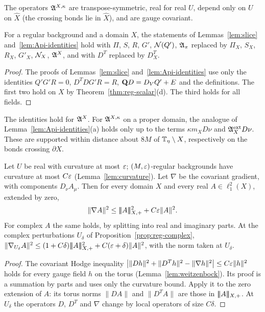 The operators $\mathfrak A^{X,\kappa}$ are transpose-symmetric, real for real $U$, depend only on $U$ on $\hat X$ (the crossing bonds lie in $\hat X$), and are gauge covariant.

\begin{lemma}\label{lem:domain-identities}
For a regular background and a domain $X$, the statements of Lemmas~\ref{lem:slice} and~\ref{lem:Api-identities} hold with $\Pi$, $S$, $R$, $G'$, $\mathcal N(Q')$, $\mathfrak A_\pi$ replaced by $\Pi_X$, $S_X$, $R_X$, $G'_X$, $\mathcal N_X$, $\mathfrak A^X$, and with $D^T$ replaced by $D^T_X$.
\end{lemma}

\begin{proof}
The proofs of Lemmas~\ref{lem:slice} and~\ref{lem:Api-identities} use only the identities $Q'G'R=0$, $D^TDG'R=R$, $\mathbf Q D=D_VQ'+E$ and the definitions. The first two hold on $X$ by Theorem~\ref{thm:reg-scalar}(d). The third holds for all fields.
\end{proof}

The identities hold for $\mathfrak A^X$. For $\mathfrak A^{X,\kappa}$ on a proper domain, the analogue of Lemma~\ref{lem:Api-identities}(a) holds only up to the terms $\kappa m_XD\nu$ and $\mathfrak A^{\rm ext}_XD\nu$. These are supported within distance about $8M$ of $\mathbb T_\eta\setminus X$, respectively on the bonds crossing $\partial X$.

\begin{lemma}\label{lem:full-gradient}
Let $U$ be real with curvature at most $\varepsilon$; $(M,\varepsilon)$-regular backgrounds have curvature at most $C\varepsilon$ (Lemma~\ref{lem:curvature}). Let $\nabla$ be the covariant gradient, with components $D_\nu A_\mu$. Then for every domain $X$ and every real $A\in\ell^2_1(X)$, extended by zero,
\[
\|\nabla A\|^2\le|\!|\!|A|\!|\!|_{X,+}^2+C\varepsilon\|A\|^2 .
\]
For complex $A$ the same holds, by splitting into real and imaginary parts. At the complex perturbations $U_\delta$ of Proposition~\ref{prop:reg-complex}, $\|\nabla_{U_\delta}A\|^2\le(1+C\delta)|\!|\!|A|\!|\!|_{X,+}^2+C(\varepsilon+\delta)\|A\|^2$, with the norm taken at $U_\delta$.
\end{lemma}

\begin{proof}
The covariant Hodge inequality $\big|\|Dh\|^2+\|D^Th\|^2-\|\nabla h\|^2\big|\le C\varepsilon\|h\|^2$ holds for every gauge field $h$ on the torus (Lemma~\ref{lem:weitzenbock}). Its proof is a summation by parts and uses only the curvature bound. Apply it to the zero extension of $A$: its torus norms $\|DA\|$ and $\|D^TA\|$ are those in $|\!|\!|A|\!|\!|_{X,+}$. At $U_\delta$ the operators $D$, $D^T$ and $\nabla$ change by local operators of size $C\delta$.
\end{proof}

